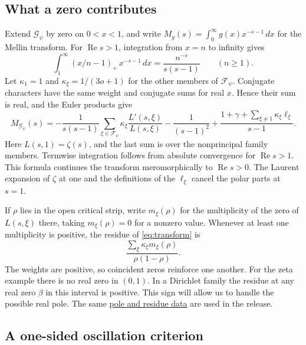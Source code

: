 \documentclass[11pt,letterpaper]{article}
\newcommand{\Rea}{\operatorname{Re}}
\newcommand{\src}[2]{\href{https://github.com/leanprover-community/riemann-hypothesis/blob/main/src/#1.lean}{#2}}
\numberwithin{equation}{section}
\begin{document}
\subsection*{What a zero contributes}

Extend \(\mathcal G_\psi\) by zero on \(0<x<1\), and write \(M_g(s)=\int_0^\infty g(x)x^{-s-1}\,dx\) for the Mellin transform. For \(\Rea s>1\), integration from \(x=n\) to infinity gives
\[
           \int_1^\infty (x/n-1)_+\,x^{-s-1}\,dx
                  =\frac{n^{-s}}{s(s-1)}\qquad(n\ge1).
\]
Let \(\kappa_1=1\) and \(\kappa_\xi=1/(3o+1)\) for the other members of \(\mathcal F_\psi\). Conjugate characters have the same weight and conjugate sums for real \(x\). Hence their sum is real, and the Euler products give
\begin{equation}\label{eq:transform}
 M_{\mathcal G_\psi}(s)
  =-\frac1{s(s-1)}\sum_{\xi\in\mathcal F_\psi}\kappa_\xi
                 \frac{L'(s,\xi)}{L(s,\xi)}
       -\frac1{(s-1)^2}
       +\frac{1+\gamma+\sum_{\xi\ne1}\kappa_\xi\ell_\xi}{s-1}.
\end{equation}
Here \(L(s,1)=\zeta(s)\), and the last sum is over the nonprincipal family members. Termwise integration follows from absolute convergence for \(\Rea s>1\). This formula continues the transform meromorphically to \(\Rea s>0\). The Laurent expansion of \(\zeta\) at one and the definitions of the \(\ell_\xi\) cancel the polar parts at \(s=1\).

If \(\rho\) lies in the open critical strip, write \(m_\xi(\rho)\) for the multiplicity of the zero of \(L(s,\xi)\) there, taking \(m_\xi(\rho)=0\) for a nonzero value. Whenever at least one multiplicity is positive, the residue of \eqref{eq:transform} is
\begin{equation}\label{eq:res}
                  \frac{\sum_\xi\kappa_\xi m_\xi(\rho)}{\rho(1-\rho)} .
\end{equation}
The weights are positive, so coincident zeros reinforce one another. For the zeta example there is no real zero in \((0,1)\). In a Dirichlet family the residue at any real zero \(\beta\) in this interval is positive. This sign will allow us to handle the possible real pole. The same
\src{Development/AutomorphicArithmetic/DedekindLFunctions/LandauTheorems/poleData}{pole and residue data}
are used in the release.

\subsection*{A one-sided oscillation criterion}
\end{document}
